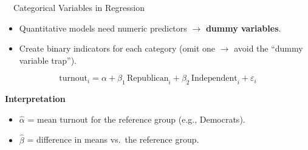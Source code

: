 \documentclass[aspectratio=169,11pt]{beamer}
\begin{document}
\begin{frame}{\ \ Categorical Variables in Regression}
  \begin{itemize}
    \item Quantitative models need numeric predictors $\rightarrow$ \textbf{dummy variables}.
    \item Create binary indicators for each category (omit one $\rightarrow$ avoid the ``dummy variable trap'').
  \end{itemize}
  \vspace{0.4em}
  \begin{keybox}[Example]
    \begin{equation*}
      \text{turnout}_i = \alpha + \beta_1\,\text{Republican}_i + \beta_2\,\text{Independent}_i + \varepsilon_i
    \end{equation*}
  \end{keybox}
  \vspace{0.3em}
  \textbf{\color{qrnavy}Interpretation}
  \begin{itemize}
    \item $\hat{\alpha}$ = mean turnout for the reference group (e.g., Democrats).
    \item $\hat{\beta}$ = difference in means vs.\ the reference group.
  \end{itemize}
\end{frame}
\end{document}
